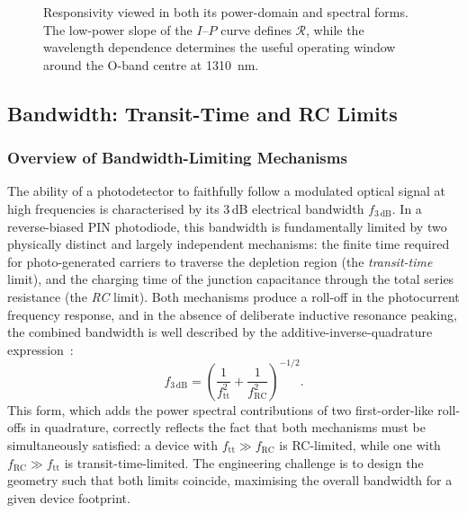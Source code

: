 \begin{figure}[H]
    \centering
    \caption{Responsivity viewed in both its power-domain and spectral forms.
    The low-power slope of the $I$--$P$ curve defines $\mathcal{R}$, while
    the wavelength dependence determines the useful operating window around
    the O-band centre at \SI{1310}{\nano\metre}.}
    \label{fig:responsivity_concept}
\end{figure}

\subsection[Bandwidth: Transit-Time and RC Limits]{Bandwidth: Transit-Time and RC Limits}
\label{subsec:pd_bw}

\subsubsection{Overview of Bandwidth-Limiting Mechanisms}

The ability of a photodetector to faithfully follow a modulated optical signal
at high frequencies is characterised by its \mbox{3\,dB} electrical bandwidth
$f_{3\,\mathrm{dB}}$. In a reverse-biased PIN photodiode, this bandwidth is
fundamentally limited by two physically distinct and largely independent
mechanisms: the finite time required for photo-generated carriers to traverse
the depletion region (the \emph{transit-time} limit), and the charging time of
the junction capacitance through the total series resistance (the \emph{RC}
limit). Both mechanisms produce a roll-off in the photocurrent frequency
response, and in the absence of deliberate inductive resonance peaking, the
combined bandwidth is well described by the additive-inverse-quadrature
expression~\cite{SalehTeich1991}:
\begin{equation}
    f_{3\,\mathrm{dB}}
    = \left(\frac{1}{f_{\mathrm{tt}}^2}
      + \frac{1}{f_{\mathrm{RC}}^2}\right)^{-1/2}.
    \label{eq:bw_total}
\end{equation}
This form, which adds the power spectral contributions of two first-order-like
roll-offs in quadrature, correctly reflects the fact that both mechanisms must
be simultaneously satisfied: a device with $f_{\mathrm{tt}} \gg f_{\mathrm{RC}}$
is RC-limited, while one with $f_{\mathrm{RC}} \gg f_{\mathrm{tt}}$ is
transit-time-limited. The engineering challenge is to design the geometry such
that both limits coincide, maximising the overall bandwidth for a given device
footprint.

